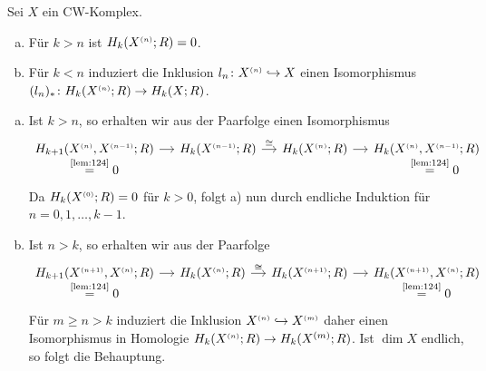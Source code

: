 \begin{lemma}[{name=[{Die Homologie des $n$-Gerüsts und die von $X^\ssbrace{n} \hookrightarrow X$ induzierte Abbildung}]},label=lem:128]
	Sei $X$ ein CW-Komplex.
	\begin{enumerate}[a)]
		\item Für $k >n$ ist $H_k(X^{\scriptscriptstyle(n)};R)=0$.
		\item Für $k <n$ induziert die Inklusion $l_n\colon X^{\scriptscriptstyle(n)} \hookrightarrow X$ einen Isomorphismus $(l_n)_* \colon H_k(X^{\scriptscriptstyle(n)};R) \to H_k(X;R)$.
	\end{enumerate}
\end{lemma}
\begin{beweis}
	\leavevmode
	\begin{enumerate}[a)]
		\item Ist $k>n$, so erhalten wir aus der Paarfolge einen Isomorphismus
		\[
			\begin{tikzcd}[column sep=small]
				\underset{\textstyle\StackText{\ref{lem:124}}{=} 0}{H_{k+1}\enbrace*{X^\ssbrace{n}, X^\ssbrace{n-1};R}} \rar &  H_k(X^\ssbrace{n-1};R) \rar["\cong"] & 
				H_k(X^\ssbrace{n};R) \rar 
				& H_k \underset{\textstyle\StackText{\ref{lem:124}}{=}0}{\enbrace*{X^\ssbrace{n}, X^\ssbrace{n-1};R} }
			\end{tikzcd}
		\]
		Da $H_k(X^{{\scriptscriptstyle(0)}};R)=0$ für $k>0$, folgt a) nun durch endliche Induktion für $n=0,1, \ldots , k-1$.
		\item Ist $n >k$, so erhalten wir aus der Paarfolge
		\[
			\begin{tikzcd}[column sep=small]
				\underset{\textstyle\StackText{\ref{lem:124}}{=}0}{H_{k+1} \enbrace*{X^\ssbrace{n+1},X^\ssbrace{n};R}} \rar & H_k \enbrace*{X^\ssbrace{n};R} \rar["\cong"] 
				& H_k \enbrace*{X^\ssbrace{n+1};R} \rar 
				& \underset{\textstyle\StackText{\ref{lem:124}}{=}0}{H_k \enbrace*{X^\ssbrace{n+1},X^\ssbrace{n};R}}
			\end{tikzcd}
		\]
		Für $m \ge n >k$ induziert die Inklusion $X^{\scriptscriptstyle(n)} \hookrightarrow X^{\scriptscriptstyle(m)}$ daher einen Isomorphismus in Homologie $H_k(X^{\scriptscriptstyle(n)};R) \to H_k(X^{(m)};R)$. 
		Ist $\dim X$ endlich, so folgt die Behauptung. 
	

\end{enumerate}
\end{beweis}
